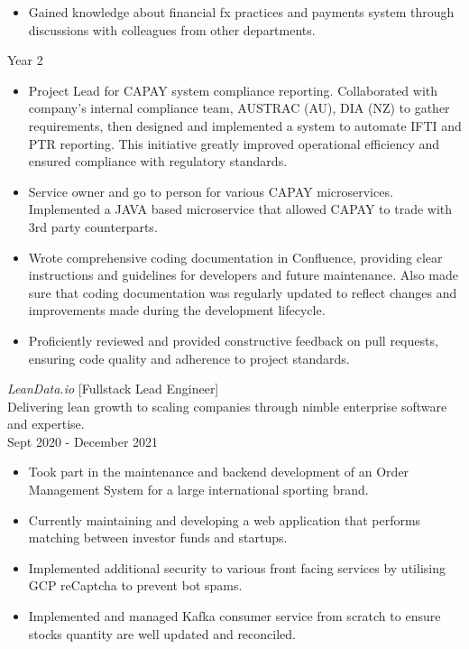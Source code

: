 \documentclass[10pt, a4paper]{cv}
\begin{document}
\begin{paracol}{2}
\begin{flushleft}
\begin{itemize}[ topsep=0pt]
			\item Gained knowledge about financial fx practices and payments system through discussions with colleagues from other departments.
		\end{itemize}
		\vspace{6pt}
		\quad Year 2
		\begin{itemize}[ topsep=0pt]  \itemsep -2pt
			\item Project Lead for CAPAY system compliance reporting. Collaborated with company's internal compliance team, AUSTRAC (AU), DIA (NZ) to gather requirements, then designed and implemented a system to automate IFTI and PTR reporting.  This initiative greatly improved operational efficiency and ensured compliance with regulatory standards.
			\item Service owner and go to person for various CAPAY microservices. Implemented a JAVA based microservice that allowed CAPAY to trade with 3rd party counterparts.
			\item Wrote comprehensive coding documentation in Confluence, providing clear instructions and guidelines for developers and future maintenance. Also made sure that coding documentation was regularly updated to reflect changes and improvements made during the development lifecycle.
			\item Proficiently reviewed and provided constructive feedback on pull requests, ensuring code quality and adherence to project standards.
		\end{itemize}
		\switchcolumn
		\vspace{43pt}
		{\sl LeanData.io } [Fullstack Lead Engineer] \\
		Delivering lean growth to scaling companies through nimble enterprise software and expertise.\\
		Sept 2020 - December 2021
		\begin{itemize} \itemsep -2pt
			\item Took part in the maintenance and backend development of an Order Management System for a large international sporting brand.
			\item Currently maintaining and developing a web application that performs matching between investor funds and startups.
			\item Implemented additional security to various front facing services by utilising GCP reCaptcha to prevent bot spams.
			\item Implemented and managed Kafka consumer service from scratch to ensure stocks quantity are well updated and reconciled.

\end{itemize}
\end{flushleft}
\end{paracol}
\end{document}
